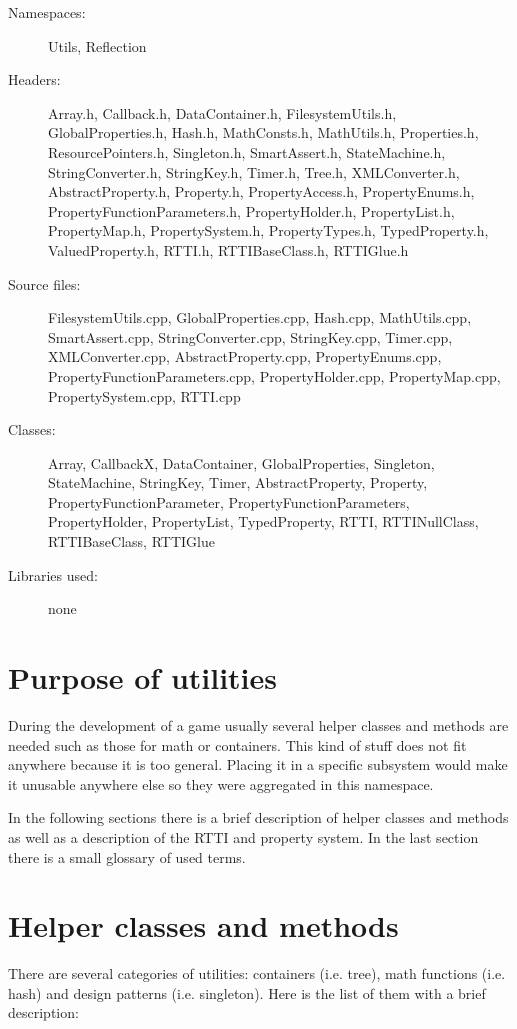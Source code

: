 \begin{description}
  \item[Namespaces:] Utils, Reflection
  \item[Headers:] Array.h, Callback.h, DataContainer.h, FilesystemUtils.h, GlobalProperties.h, Hash.h, MathConsts.h, MathUtils.h, Properties.h, ResourcePointers.h, Singleton.h, SmartAssert.h, StateMachine.h, StringConverter.h, StringKey.h, Timer.h, Tree.h, XMLConverter.h, AbstractProperty.h, Property.h, PropertyAccess.h, PropertyEnums.h, PropertyFunctionParameters.h, PropertyHolder.h, PropertyList.h, Property\-Map.h, PropertySystem.h, PropertyTypes.h, TypedProperty.h, ValuedProperty.h, RTTI.h, RTTIBaseClass.h, RTTIGlue.h
  \item[Source files:] FilesystemUtils.cpp, GlobalProperties.cpp, Hash.cpp, Math\-Utils.cpp, SmartAssert.cpp, StringConverter.cpp, StringKey.cpp, Ti\-mer\-.cpp, XMLConverter.cpp, AbstractProperty.cpp, Property\-Enums\-.cpp, PropertyFunctionParameters.cpp, PropertyHolder.cpp, Property\-Map\-.cpp, PropertySystem.cpp, RTTI.cpp
  \item[Classes:] Array, CallbackX, DataContainer, GlobalProperties, Singleton,\\ StateMachine, StringKey, Timer, AbstractProperty, Property, PropertyFunctionParameter, PropertyFunctionParameters, PropertyHolder, PropertyList, TypedProperty, RTTI, RTTINullClass, RTTIBaseClass, RTTIGlue
  \item[Libraries used:] none
\end{description}


\section{Purpose of utilities}
During the development of a game usually several helper classes and methods are needed such as those for math or containers. This kind of stuff does not fit anywhere because it is too general. Placing it in a specific subsystem would make it unusable anywhere else so they were aggregated in this namespace.

In the following sections there is a brief description of helper classes and methods as well as a description of the RTTI and property system. In the last section there is a small glossary of used terms.

\section{Helper classes and methods}
There are several categories of utilities: containers (i.e. tree), math functions (i.e. hash) and design patterns (i.e. singleton). Here is the list of them with a brief description:

